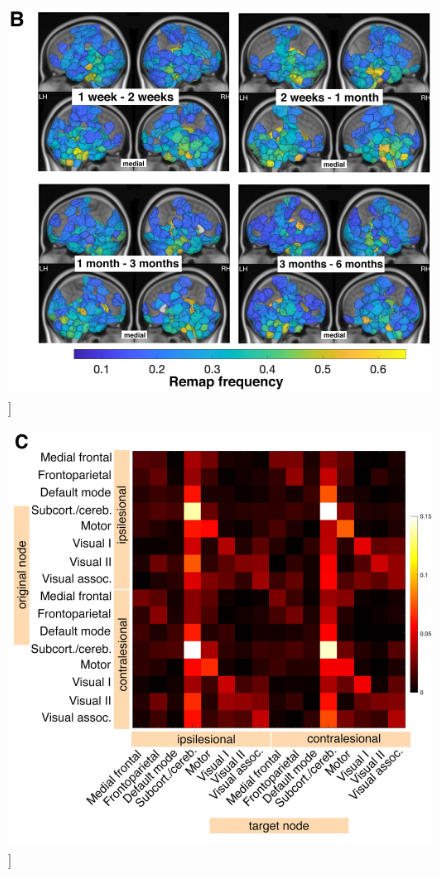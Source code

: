 \documentclass[phd,tocprelim]{cornell}
\renewcommand{\caption}[1]{\singlespacing\hangcaption{#1}\normalspacing}
\begin{document}
\vfill
\begin{figure}[h!]
		\ContinuedFloat
		\captionsetup{labelformat=adja-page}
    \centering
    \includegraphics[width=\textwidth]{chapter1/SupplementaryFigure13B.png}
    \caption[]{}
\end{figure}
\null
\vfill
\clearpage
\null
\vfill
\begin{figure}[h!]
		\ContinuedFloat
		\captionsetup{labelformat=adja-page}
    \centering
    \includegraphics[width=\textwidth]{chapter1/SupplementaryFigure13C.png}
    \caption[]{}
\end{figure}
\end{document}
